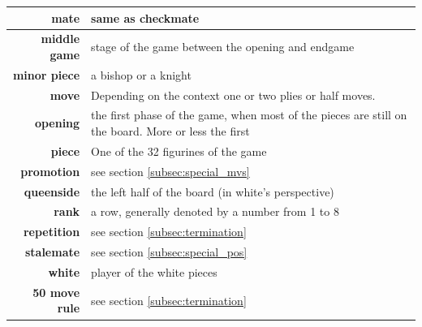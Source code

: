 \begin{table}[]
\begin{tabular}{rL{10cm}}
\textbf{mate}         &  same as checkmate                                                                 \\ \hline
\textbf{middle game}  &   stage of the game between the opening and endgame                                                               \\ \hline
\textbf{minor piece}  &  a bishop or a knight
\\ \hline
\textbf{move}  & Depending on the context one or two plies or half moves.                                                   \\ \hline
\textbf{opening}      &  the first phase of the game, when most of the pieces are still on the board. More or less the first                                                                  \\ \hline
\textbf{piece}        & One of the 32 figurines of the game                                                                  \\ \hline
\textbf{promotion}    & see section \ref{subsec:special_mvs}                                                                  \\
\textbf{queenside}    & the left half of the board (in white's perspective)                                                                   \\ \hline
\textbf{rank}         & a row, generally denoted by a number from 1 to 8                                                                  \\ \hline
\textbf{repetition}   &  see section \ref{subsec:termination}                                                                 \\ \hline
\textbf{stalemate}    & see section \ref{subsec:special_pos}                                                                  \\ \hline
\textbf{white}        & player of the white pieces                                                                  \\ \hline
\textbf{50 move rule} &  see section \ref{subsec:termination}          \\                                                      \hline
\end{tabular}
\end{table}